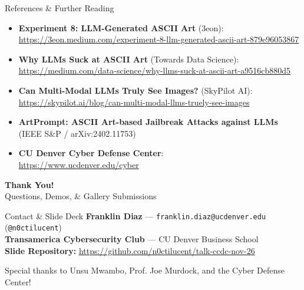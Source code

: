 \documentclass[12pt]{beamer}
\begin{document}
\begin{frame}{References \& Further Reading}
  \begin{itemize}
    \item \textbf{Experiment 8: LLM-Generated ASCII Art} (3eon): \\
      \footnotesize\url{https://3eon.medium.com/experiment-8-llm-generated-ascii-art-879e96053867}
    \item \textbf{Why LLMs Suck at ASCII Art} (Towards Data Science): \\
      \footnotesize\url{https://medium.com/data-science/why-llms-suck-at-ascii-art-a9516cb880d5}
    \item \textbf{Can Multi-Modal LLMs Truly See Images?} (SkyPilot AI): \\
      \footnotesize\url{https://skypilot.ai/blog/can-multi-modal-llms-truely-see-images}
    \item \textbf{ArtPrompt: ASCII Art-based Jailbreak Attacks against LLMs} (IEEE S\&P / arXiv:2402.11753)
    \item \textbf{CU Denver Cyber Defense Center}: \\
      \footnotesize\url{https://www.ucdenver.edu/cyber}
  \end{itemize}
\end{frame}

\begin{frame}[plain]
  \centering
  \vspace*{1.2cm}
  {\Huge\bfseries\textcolor{accent1}{Thank You!}}\\[0.3cm]
  {\Large\normalfont Questions, Demos, \& Gallery Submissions}\\[0.6cm]

  \begin{block}{Contact \& Slide Deck}
    \centering\small
    \textbf{Franklin Diaz} --- \texttt{franklin.diaz@ucdenver.edu} \quad (\texttt{@n0ctilucent}) \\
    \textbf{Transamerica Cybersecurity Club} --- CU Denver Business School \\
    \textbf{Slide Repository:} \url{https://github.com/n0ctilucent/talk-ccdc-nov-26}
  \end{block}

  \vspace{0.4cm}
  \footnotesize\textcolor{bulletcolor}{Special thanks to Unsu Mwambo, Prof. Joe Murdock, and the Cyber Defense Center!}
\end{frame}
\end{document}
